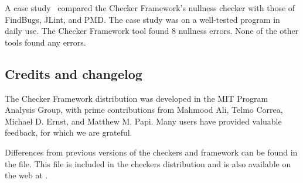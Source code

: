 A case study~\cite[\S6]{PapiACPE2008} compared the Checker Framework's nullness
checker with those of FindBugs, JLint, and PMD\@.  The case study was on a
well-tested program in daily use.  The Checker Framework tool found 8
nullness errors.  None of the other tools found any errors.



\subsection{Credits and changelog\label{credits}}

The Checker Framework distribution was developed in the MIT Program Analysis
Group, with prime contributions from Mahmood Ali, Telmo Correa, Michael
D. Ernst, and Matthew M. Papi.
Many users have provided valuable feedback, for which we are grateful.


Differences from previous versions of the checkers and framework can be found
in the  file.  This file is included in the
checkers distribution and is also available on the web at
.






